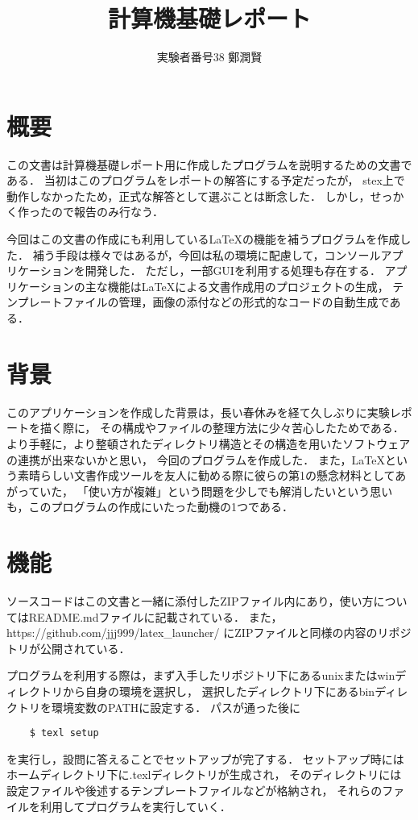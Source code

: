 \documentclass[dvipdfmx]{jsarticle}
\begin{document}
\title{計算機基礎レポート}
\author{実験者番号38 鄭潤賢}
\date{}         %
\maketitle


\section{概要}
この文書は計算機基礎レポート用に作成したプログラムを説明するための文書である．
当初はこのプログラムをレポートの解答にする予定だったが，
stex上で動作しなかったため，正式な解答として選ぶことは断念した．
しかし，せっかく作ったので報告のみ行なう．

今回はこの文書の作成にも利用している\LaTeX の機能を補うプログラムを作成した．
補う手段は様々ではあるが，今回は私の環境に配慮して，コンソールアプリケーションを開発した．
ただし，一部GUIを利用する処理も存在する．
アプリケーションの主な機能は\LaTeX による文書作成用のプロジェクトの生成，
テンプレートファイルの管理，画像の添付などの形式的なコードの自動生成である．

\section{背景}
このアプリケーションを作成した背景は，長い春休みを経て久しぶりに実験レポートを描く際に，
その構成やファイルの整理方法に少々苦心したためである．
より手軽に，より整頓されたディレクトリ構造とその構造を用いたソフトウェアの連携が出来ないかと思い，
今回のプログラムを作成した．
また，\LaTeX という素晴らしい文書作成ツールを友人に勧める際に彼らの第1の懸念材料としてあがっていた， 
「使い方が複雑」という問題を少しでも解消したいという思いも，このプログラムの作成にいたった動機の1つである．

\section{機能}
ソースコードはこの文書と一緒に添付したZIPファイル内にあり，使い方についてはREADME.mdファイルに記載されている．
また，{https://github.com/jjj999/latex\_launcher/} にZIPファイルと同様の内容のリポジトリが公開されている．

プログラムを利用する際は，まず入手したリポジトリ下にあるunixまたはwinディレクトリから自身の環境を選択し，
選択したディレクトリ下にあるbinディレクトリを環境変数のPATHに設定する．
パスが通った後に

\begin{verbatim}
    $ texl setup
\end{verbatim}
を実行し，設問に答えることでセットアップが完了する．
セットアップ時にはホームディレクトリ下に.texlディレクトリが生成され，
そのディレクトリには設定ファイルや後述するテンプレートファイルなどが格納され，
それらのファイルを利用してプログラムを実行していく．
\end{document}
